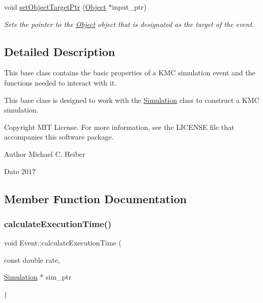 \begin{DoxyCompactItemize}
void \hyperlink{class_event_a2e868dc951b6fec86703dcd7776680e0}{set\+Object\+Target\+Ptr} (\hyperlink{class_object}{Object} $\ast$input\+\_\+ptr)
\begin{DoxyCompactList}\small\item\em Sets the pointer to the \hyperlink{class_object}{Object} object that is designated as the target of the event. \end{DoxyCompactList}\end{DoxyCompactItemize}


\subsection{Detailed Description}
This base class contains the basic properties of a K\+MC simulation event and the functions needed to interact with it. 

This base class is designed to work with the \hyperlink{class_simulation}{Simulation} class to construct a K\+MC simulation. \begin{DoxyCopyright}{Copyright}
M\+IT License. For more information, see the L\+I\+C\+E\+N\+SE file that accompanies this software package. 
\end{DoxyCopyright}
\begin{DoxyAuthor}{Author}
Michael C. Heiber 
\end{DoxyAuthor}
\begin{DoxyDate}{Date}
2017 
\end{DoxyDate}


\subsection{Member Function Documentation}
\mbox{\label{class_event_a14b3f90f4b4d72ab1d0bf70f9b4cc907}} 
\subsubsection{\texorpdfstring{calculate\+Execution\+Time()}{calculateExecutionTime()}}
{\footnotesize\ttfamily void Event\+::calculate\+Execution\+Time (\begin{DoxyParamCaption}\item[{const double}]{rate,  }\item[{\hyperlink{class_simulation}{Simulation} $\ast$}]{sim\+\_\+ptr }\end{DoxyParamCaption})}




